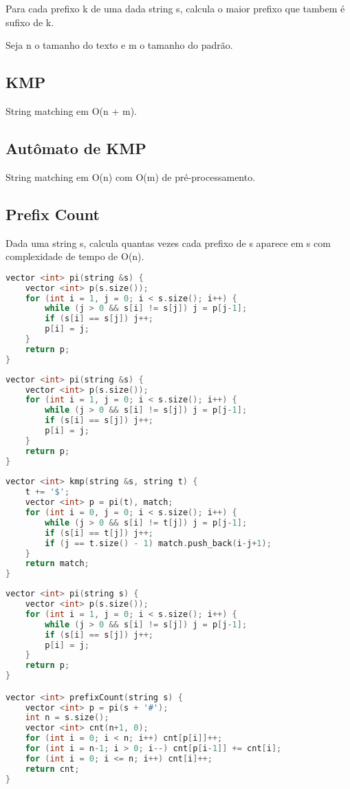 \documentclass[11pt, a4paper, twoside]{article}
\begin{document}
Para cada prefixo k de uma dada string s, calcula o maior prefixo que tambem é sufixo de k.

Seja n o tamanho do texto e m o tamanho do padrão.

\subsection{KMP}


String matching em O(n + m).

\subsection{Autômato de KMP}


String matching em O(n) com O(m) de pré-processamento.

\subsection{Prefix Count}


Dada uma string s, calcula quantas vezes cada prefixo de s aparece em s com complexidade de tempo de O(n).

\begin{multicols}{2}
\begin{lstlisting}[language=C++]
vector <int> pi(string &s) {
    vector <int> p(s.size());
    for (int i = 1, j = 0; i < s.size(); i++) {
        while (j > 0 && s[i] != s[j]) j = p[j-1];
        if (s[i] == s[j]) j++;
        p[i] = j;
    }
    return p;
}
\end{lstlisting}
\end{multicols}

\begin{lstlisting}[language=C++]
vector <int> pi(string &s) {
    vector <int> p(s.size());
    for (int i = 1, j = 0; i < s.size(); i++) {
        while (j > 0 && s[i] != s[j]) j = p[j-1];
        if (s[i] == s[j]) j++;
        p[i] = j;
    }
    return p;
}
 
vector <int> kmp(string &s, string t) {
    t += '$';
    vector <int> p = pi(t), match;
    for (int i = 0, j = 0; i < s.size(); i++) {
        while (j > 0 && s[i] != t[j]) j = p[j-1];
        if (s[i] == t[j]) j++;
        if (j == t.size() - 1) match.push_back(i-j+1); 
    }
    return match;
}
\end{lstlisting}

\begin{lstlisting}[language=C++]
vector <int> pi(string s) {
    vector <int> p(s.size());
    for (int i = 1, j = 0; i < s.size(); i++) {
        while (j > 0 && s[i] != s[j]) j = p[j-1];
        if (s[i] == s[j]) j++;
        p[i] = j;
    }
    return p;
}

vector <int> prefixCount(string s) {
    vector <int> p = pi(s + '#');
    int n = s.size();
    vector <int> cnt(n+1, 0);
    for (int i = 0; i < n; i++) cnt[p[i]]++;
    for (int i = n-1; i > 0; i--) cnt[p[i-1]] += cnt[i];
    for (int i = 0; i <= n; i++) cnt[i]++;
    return cnt;
}\end{lstlisting}
\end{document}
